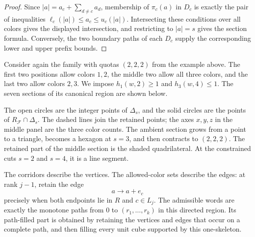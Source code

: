 \begin{proof}
Since $|a|=a_c+\sum_{d\neq c}a_d$, membership of $\pi_c(a)$ in $D_c$ is
exactly the pair of inequalities
$\ell_c(|a|)\leq a_c\leq u_c(|a|)$. Intersecting these conditions over all
colors gives the displayed intersection, and restricting to $|a|=s$ gives
the section formula. Conversely, the two boundary paths of each $D_c$ supply
the corresponding lower and upper prefix bounds.
\end{proof}

\begin{example}
Consider again the family with quotas $(2,2,2)$ from the example above. The
first two positions allow colors $1,2$, the middle two allow all three colors,
and the last two allow colors $2,3$. We impose $h_1(w,2)\geq1$ and
$h_3(w,4)\leq1$. The seven sections of its canonical region are shown below.
\end{example}


The open circles are the integer points of $\Delta_s$, and the solid circles
are the points of $R_{\mathcal F}\cap\Delta_s$. The dashed lines join the
retained points; the axes $x,y,z$ in the middle panel are the three color
counts. The ambient section grows from a point to a triangle, becomes a hexagon
at $s=3$, and then contracts to $(2,2,2)$. The retained part of the middle
section is the shaded quadrilateral. At the constrained cuts $s=2$ and $s=4$,
it is a line segment.

The corridors describe the vertices. The allowed-color sets describe the
edges: at rank $j-1$, retain the edge
\[
 a\longrightarrow a+e_c
\]
precisely when both endpoints lie in $R$ and $c\in L_j$. The admissible words
are exactly the monotone paths from $0$ to $(r_1,\dotsc,r_k)$ in this directed
region. Its path-filled part is obtained by retaining the vertices and edges
that occur on a complete path, and then filling every unit cube supported by
this one-skeleton.

